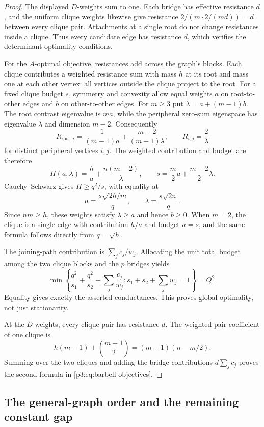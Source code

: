 \documentclass[11pt,a4paper]{article}
\theoremstyle{definition}
\theoremstyle{remark}
\numberwithin{equation}{section}
\begin{document}
\begin{proof}
The displayed $D$-weights sum to one.
Each bridge has effective resistance $d$, and the uniform clique
weights likewise give resistance $2/(m\cdot2/(md))=d$ between every
clique pair.  Attachments at a single root do not change resistances
inside a clique.  Thus every candidate edge has resistance $d$,
which verifies the determinant optimality conditions.

For the $A$-optimal objective, resistances add across the graph's
blocks.  Each clique contributes a weighted resistance sum with
mass $h$ at its root and mass one at each other vertex: all vertices
outside the clique project to the root.
For a fixed clique budget $s$, symmetry and convexity allow equal
weights $a$ on root-to-other edges and $b$ on other-to-other edges.
For $m\geq3$ put $\lambda=a+(m-1)b$.
The root contrast eigenvalue is $ma$, while the peripheral
zero-sum eigenspace has eigenvalue $\lambda$ and dimension $m-2$.
Consequently
\[
 R_{\mathrm{root},i}
 =\frac1{(m-1)a}+\frac{m-2}{(m-1)\lambda},
 \qquad R_{i,j}=\frac2\lambda
\]
for distinct peripheral vertices $i,j$.
The weighted contribution and budget are therefore
\[
 H(a,\lambda)=\frac h a+\frac{n(m-2)}\lambda,
 \qquad
 s=\frac m2a+\frac{m-2}{2}\lambda.
\]
Cauchy--Schwarz gives $H\geq q^2/s$, with equality at
\[
 a=\frac{s\sqrt{2h/m}}q,
 \qquad
 \lambda=\frac{s\sqrt{2n}}q.
\]
Since $nm\geq h$, these weights satisfy $\lambda\geq a$ and hence
$b\geq0$.  When $m=2$, the clique is a single edge with contribution
$h/a$ and budget $a=s$, and the same formula follows directly from
$q=\sqrt h$.

The joining-path contribution is $\sum_jc_j/w_j$.
Allocating the unit total budget among the two clique blocks and the
$p$ bridges yields
\[
 \min\left\{\frac{q^2}{s_1}+\frac{q^2}{s_2}
                 +\sum_j\frac{c_j}{w_j}:
          s_1+s_2+\sum_jw_j=1\right\}=Q^2.
\]
Equality gives exactly the asserted conductances.
This proves global optimality, not just stationarity.

At the $D$-weights, every clique pair has resistance $d$.
The weighted-pair coefficient of one clique is
\[
 h(m-1)+\binom{m-1}{2}=(m-1)(n-m/2).
\]
Summing over the two cliques and adding the bridge contributions
$d\sum_jc_j$ proves the second formula in
\eqref{p3:eq:barbell-objectives}.
\end{proof}

\subsection{The general-graph order and the remaining constant gap}
\end{document}
